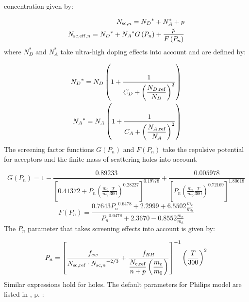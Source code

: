 \documentclass[oneside,12pt]{cgd_book}
\begin{document}
          concentration given by:
\par
\begin{subequations}
\begin{align}
N_{{\rm sc,}n} = {N_D}^* + N_A^* + p \\
N_{{\rm sc,eff,}n} = {N_D}^* + {N_A}^* G\left( {P_n } \right) + \frac{p}{ F\left( {P_n } \right)
            }
\end{align}
\end{subequations}
where $N_D^*$ and $N_A^*$ take ultra-high doping
          effects into account and are defined by:
\par
\begin{subequations}
\begin{align}
 {N_D}^* = N_D \left( 1 + \dfrac{1}{C_D + \left( \dfrac{N_{D,{\rm ref}}}{N_D} \right)^2 }
            \right) \\
 {N_A}^* = N_A \left( 1 + \dfrac{1}{C_A + \left( \dfrac{N_{A,{\rm ref}}}{N_A } \right)^2 }
            \right)
\end{align}
\end{subequations}
The screening factor functions $G\left( P_n \right)$ and $F\left( P_n \right)$
take the repulsive potential for acceptors and the finite mass of
          scattering holes into account.
\par
\begin{equation}
G\left( P_n \right) = 1 - \frac{0.89233}{\left[ 0.41372 + P_n \left(
            \frac{m_0}{m_e}\frac{T}{300} \right)^{0.28227} \right]^{0.19778} } + \frac{0.005978}{\left[ P_n \left(
            \frac{m_e}{m_0}\frac{T}{300} \right)^{0.72169} \right]^{1.80618}}
\end{equation}
\begin{equation}
F\left( P_n \right) = \frac{0.7643{P_n}^{0.6478} + 2.2999 + 6.5502\frac{m_e}{m_h} }
            {{P_n}^{0.6478} + 2.3670 - 0.8552\frac{m_e}{m_h} }
\end{equation}
The $P_n$ parameter that takes screening effects into account is given
          by:
\par
\begin{equation}
P_n = \left[ {\frac{ f_{cw} }{ N_{\rm sc,ref} \cdot {N_{{\rm sc,}n}}^{-2/3} } + \dfrac{ f_{BH}
            }{ \dfrac{ N_{\rm c,ref} } {n + p}\left( \dfrac{m_e}{m_0} \right)}} \right]^{-1} \left( \frac{T}{300}
            \right)^2
\end{equation}
Similar expressions hold for holes. The default parameters for Philips model are listed in
, p. \pageref{tab:Equation:Mobility:Philips:Param}:
\end{document}
